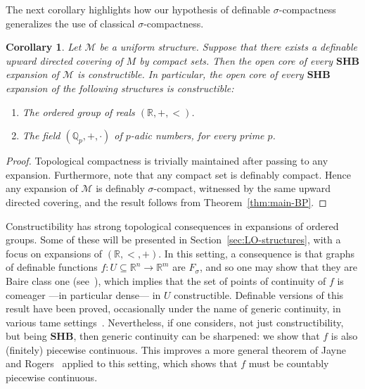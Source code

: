 \documentclass[12pt]{article}
\newcommand{\Mm}{\mathcal{M}}
\newcommand{\BP}{\textbf{SHB}}
\newcommand{\R}{\mathbb{R}}
\newcommand{\Qp}{\mathbb{Q}_p}
\newtheorem{corollary}[theorem]{Corollary}
\theoremstyle{definition}
\theoremstyle{remark}
\begin{document}
The next corollary highlights how our hypothesis of definable $\sigma$-compactness generalizes the use of classical $\sigma$-compactness. 

\begin{corollary}\label{cor:real-sigma-comp}
Let $\Mm$ be a uniform structure. Suppose that there exists a definable upward directed covering of $M$ by compact sets. Then the open core of every $\BP$ expansion of $\Mm$ is constructible. In particular, the open core of every $\BP$ expansion of the following structures is constructible: 
\begin{enumerate}
    \item The ordered group of reals $(\R, +, <)$.
    \item The field $(\Qp, +, \cdot)$ of $p$-adic numbers, for every prime $p$. 
\end{enumerate}
\end{corollary}
\begin{proof}
Topological compactness is trivially maintained after passing to any expansion. Furthermore, note that any compact set is definably compact. Hence any expansion of $\Mm$ is definably $\sigma$-compact, witnessed by the same upward directed covering, and the result follows from Theorem~\ref{thm:main-BP}.
\end{proof}

Constructibility has strong topological consequences in expansions of ordered groups. Some of these will be presented in Section~\ref{sec:LO-structures}, with a focus on expansions of $(\R,<,+)$. In this setting, a consequence is that graphs of definable functions $f:U\subseteq \R^n \rightarrow \R^m$ are $F_\sigma$, and so one may show that they are Baire class one (see~\cite{kechris-book}), which implies that the set of points of continuity of $f$ is comeager ---in particular dense--- in $U$ constructible.
Definable versions of this result have been proved, occasionally under the name of generic continuity, in various tame settings~\cite{Wal22, def-baire, HW-tetrachotomy}.
Nevertheless, if one considers, not just constructibility, but being $\BP$, then generic continuity can be sharpened: we show that $f$ is also (finitely) piecewise continuous. This improves a more general theorem of Jayne and Rogers~\cite{Jayne-Rogers} applied to this setting, which shows that $f$ must be countably piecewise continuous.  
\end{document}
